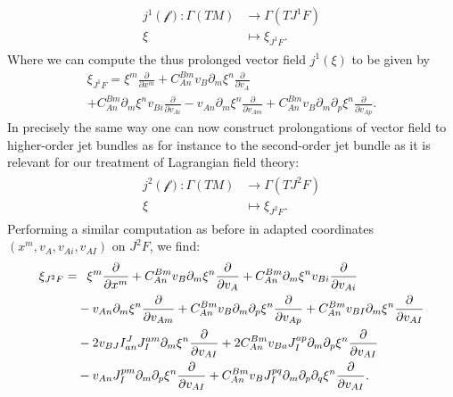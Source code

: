 \begin{align}
    \begin{aligned}
    j^1(\mathcal{f}) : \Gamma(TM) &\longrightarrow \Gamma(TJ^1F)\\
    \xi & \longmapsto \xi_{J^1F}.
    \end{aligned}
\end{align}
Where we can compute the thus prolonged vector field $j^1(\xi)$ to be given by 
\begin{multline}\label{LieJ1}
    \xi_{J^1F} = \xi^m \frac{\partial}{\partial x^m} + C_{An}^{Bm} v_B \partial_m \xi ^n \frac{\partial}{\partial v_A}\\
    + C_{An}^{Bm} \partial_m \xi^n v_{Bi} \frac{\partial}{\partial v_{Ai}} - v_{An} \partial_m \xi ^n \frac{\partial}{\partial v_{Am}} + C_{An}^{Bm} v_B \partial_m \partial_p \xi^n \frac{\partial}{\partial v_{Ap}}.
\end{multline}
In precisely the same way one can now construct prolongations of vector field to higher-order jet bundles as for instance to the second-order jet bundle as it is relevant for our treatment of Lagrangian field theory:
\begin{align}
    \begin{aligned}
    j^2(\mathcal{f}) : \Gamma(TM) &\longrightarrow \Gamma(TJ^2F)\\
    \xi & \longmapsto \xi_{J^2F}.
    \end{aligned}
\end{align}
Performing a similar computation as before in adapted coordinates $(x^m,v_A,v_{Ai}, v_{AI})$ on $J^2F$, we find:
\begin{align}\label{LieJ2}
\begin{aligned}
    \xi_{J^2F} = &\hphantom{-} \xi^m \frac{\partial}{\partial x^m} + C_{An}^{Bm} v_B \partial_m \xi ^n \frac{\partial}{\partial v_A}
    + C_{An}^{Bm} \partial_m \xi^n v_{Bi} \frac{\partial}{\partial v_{Ai}}\\
    &- v_{An} \partial_m \xi ^n \frac{\partial}{\partial v_{Am}} + C_{An}^{Bm} v_B \partial_m \partial_p \xi^n \frac{\partial}{\partial v_{Ap}} 
    + C_{An}^{Bm} v_{BI} \partial_m \xi ^n \frac{\partial}{\partial v_{AI}}\\
    &- 2 v_{BJ} I^J_{an}J^{am}_I \partial_m \xi^n \frac{\partial}{\partial v_{AI}} + 2 C_{An}^{Bm} v_{Ba}J^{ap}_I \partial_m \partial_p \xi^n \frac{\partial}{\partial v_{AI}}\\
    &- v_{An} J^{pm}_I \partial_m \partial_p \xi^n\frac{\partial}{\partial v_{AI}} + C_{An}^{Bm} v_B J^{pq}_I \partial_m \partial_p \partial_q \xi^n \frac{\partial}{\partial v_{AI}}.
\end{aligned}
\end{align}
